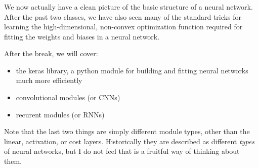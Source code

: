 \documentclass[xetex,mathserif,serif,aspectratio=169]{beamer}
\begin{document}
\begin{frame}[fragile] \frametitle{} \oldB \small

\textbf{}

We now actually have a clean picture of the basic structure of a neural
network. After the past two classes, we have also seen many of the standard
tricks for learning the high-dimensional, non-convex optimization function
required for fitting the weights and biases in a neural network.

After the break, we will cover:
\begin{itemize}
\item the keras library, a python module for building and fitting neural networks
much more efficiently
\item convolutional modules (or CNNs)
\item recurent modules (or RNNs)
\end{itemize}
Note that the last two things are simply different module types, other than
the linear, activation, or cost layers. Historically they are described as
different \textit{types} of neural networks, but I do not feel that is a
fruitful way of thinking about them.

\end{frame}
\end{document}
